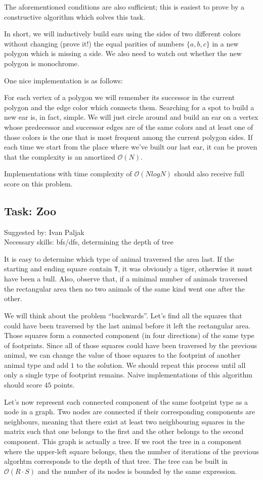 \documentclass[a4paper]{article}
\begin{document}
The aforementioned conditions are also sufficient; this is easiest to prove by a
constructive algorithm which solves this task.

In short, we will inductively build ears using the sides of two different colors
without changing (prove it!) the equal parities of numbers $\{a, b, c\}$ in a
new polygon which is missing a side. We also need to watch out whether the new
polygon is monochrome.

One nice implementation is as follows:

For each vertex of a polygon we will remember its successor in the current
polygon and the edge color which connects them. Searching for a spot to build a
new ear is, in fact, simple. We will just circle around and build an ear on a
vertex whose predecessor and successor edges are of the same colors and at least
one of those colors is the one that is most frequent among the current polygon
sides. If each time we start from the place where we've built our last ear, it
can be proven that the complexity is an amortized $\mathcal{O}(N)$.

Implementations with time complexity of $\mathcal{O}(N log N)$ should also
receive full score on this problem.

\clearpage

\subsection*{Task: Zoo}
\textsf{Suggested by: Ivan Paljak}\\
\textsf{Necessary skills: bfs/dfs, determining the depth of tree}

It is easy to determine which type of animal traversed the area last. If
the starting and ending square contain \texttt{T}, it was obviously a tiger,
otherwise it must have been a bull. Also, observe that, if a minimal number
of animals traversed the rectangular area then no two animals of the same
kind went one after the other.

We will think about the problem ``backwards''. Let's find all the squares that
could have been traversed by the last animal before it left the rectangular area.
Those squares form a connected component (in four directions) of the same type
of footprints. Since all of those squares could have been traversed by the
previous animal, we can change the value of those squares to the footprint of
another animal type and add $1$ to the solution. We should repeat this process
until all only a single type of footprint remains. Naive implementations of this
algorithm should score $45$ points.

Let's now represent each connected component of the same footprint type as a
node in a graph. Two nodes are connected if their corresponding components are
neighbours, meaning that there exist at least two neighbouring squares in the
matrix such that one belongs to the first and the other belongs to the second
component. This graph is actually a tree. If we root the tree in a component
where the upper-left square belongs, then the number of iterations of the
previous algorhtm corresponds to the depth of that tree. The tree can be built
in $\mathcal{O}(R\cdot S)$ and the number of its nodes is bounded by the same
expression.
\end{document}
